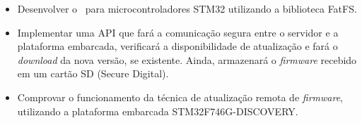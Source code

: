  \begin{itemize}
   \item Desenvolver o \bootloader\ para microcontroladores STM32 utilizando a biblioteca FatFS.
   
   
   \item Implementar uma API que fará a comunicação segura entre o servidor e a plataforma embarcada, verificará a disponibilidade de atualização e fará o \textit{download} da nova versão, se existente. Ainda, armazenará o \textit{firmware} recebido em um cartão SD (Secure Digital). 
   
   \item Comprovar o funcionamento da técnica de atualização remota de \textit{firmware}, utilizando a plataforma embarcada STM32F746G-DISCOVERY.
   
 \end{itemize}
 
